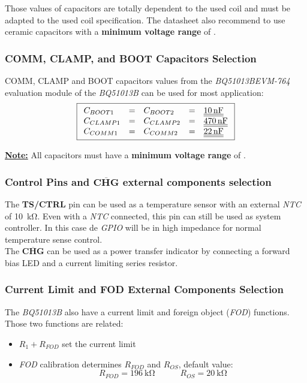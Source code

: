 \documentclass[report.tex]{subfiles}
\begin{document}
Those values of capacitors are totally dependent to the used coil and must be adapted to the used coil specification. The datasheet also recommend to use ceramic capacitors with a \textbf{minimum voltage range} of .

\subsubsection{COMM, CLAMP, and BOOT Capacitors Selection}

COMM, CLAMP and BOOT capacitors values from the \textit{BQ51013BEVM-764} evaluation module of the \textit{BQ51013B} can be used for most application:
$$
\boxed{\begin{array}{l c l c l}
C_{BOOT1} & = & C_{BOOT2} & = & \underline{\underline{\SI{10}{\nano\farad}}} \\
C_{CLAMP1} & = & C_{CLAMP2} & = & \underline{\underline{\SI{470}{\nano\farad}}} \\
C_{COMM1} & = & C_{COMM2} & = & \underline{\underline{\SI{22}{\nano\farad}}}
\end{array}}
$$

\textbf{\underline{Note:}} All capacitors must have a \textbf{minimum voltage range} of .

\subsubsection{Control Pins and $\overline{\textbf{CHG}}$ external components selection}
The \textbf{TS/CTRL} pin can be used as a temperature sensor with an external \textit{NTC} of \SI{10}{\kilo\ohm}. Even with a \textit{NTC} connected, this pin can still be used as system controller. In this case de \textit{GPIO} will be in high impedance for normal temperature sense control.\\

The $\overline{\textbf{CHG}}$ can be used as a power transfer indicator by connecting a forward bias LED and a current limiting series resistor.

\subsubsection{Current Limit and FOD External Components Selection}

The \textit{BQ51013B} also have a current limit and foreign object (\textit{FOD}) functions. Those two functions are related:
\begin{itemize}
\item $R_1 + R_{FOD}$ set the current limit
\item \textit{FOD} calibration determines $R_{FOD}$ and $R_{OS}$, default value:
$$
	\boxed{R_{FOD} = \SI{196}{\kilo\ohm}} \quad \quad \quad \boxed{R_{OS} = \SI{20}{\kilo\ohm}}
$$
\end{itemize}
\end{document}

